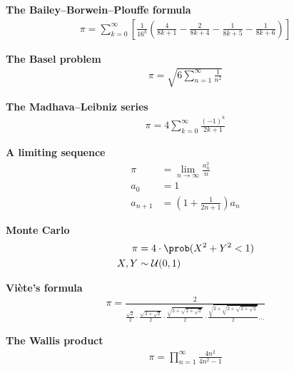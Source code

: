 \documentclass{article}
\begin{document}
\newcommand{\gap}{\vspace{2em}}

\centering

\textbf{The Bailey--Borwein--Plouffe formula}
\begin{align*}
    \pi = \sum_{k=0}^\infty
    \left[
        \frac{1}{16^k}
        \left(
        \frac{4}{8k+1} -
        \frac{2}{8k+4} -
        \frac{1}{8k+5} -
        \frac{1}{8k+6}
        \right)
        \right]
\end{align*}

\gap

\textbf{The Basel problem}
\begin{align*}
    \pi = \sqrt{6 \sum_{n=1}^\infty \frac{1}{n^2}}
\end{align*}

\gap

\textbf{The Madhava--Leibniz series}
\begin{align*}
    \pi = 4 \sum_{k=0}^\infty \frac{(-1)^k}{2k + 1}
\end{align*}

\gap

\textbf{A limiting sequence}
\begin{align*}
    \pi     & = \lim_{n \to \infty}\frac{a^2_n}{n}      \\
    a_0     & = 1                                       \\
    a_{n+1} & = \left( 1 + \frac{1}{2n + 1} \right) a_n
\end{align*}

\gap

\textbf{Monte Carlo}
\begin{align*}
    \pi & = 4 \cdot \prob( X^2 + Y^2 < 1) \\
    X,Y & \sim \mathcal{U}(0,1)
\end{align*}

\gap

\textbf{Viète's formula}
\begin{align*}
    \pi = \frac{2}{
        \frac{\sqrt{2}}{2} \cdot
        \frac{\sqrt{2 + \sqrt{2}}}{2} \cdot
        \frac{\sqrt{2 + \sqrt{2 + \sqrt{2}}}}{2} \cdot
        \frac{\sqrt{2 + \sqrt{2 + \sqrt{2  + \sqrt{2}}}}}{2} \ldots
    }
\end{align*}

\gap
\textbf{The Wallis product}
\begin{align*}
    \pi = \prod_{n=1}^\infty \frac{4n^2}{4n^2 - 1}
\end{align*}
\end{document}
